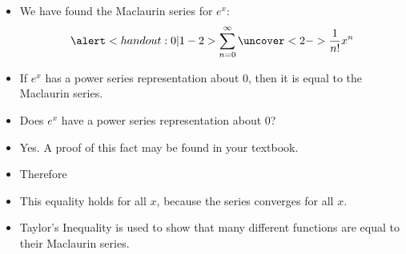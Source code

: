 \begin{frame}
\begin{itemize}
\item  We have found the Maclaurin series for $e^x$:
\abovedisplayskip=0pt
\belowdisplayskip=0pt
\[
\alert<handout:0| 1-2>{\sum_{n=0}^\infty \uncover<2->{\frac{1}{n!}}x^n}
\]
\item<3->  If $e^x$ has a power series representation about $0$, then it is equal to the Maclaurin series.
\item<3->  Does $e^x$ have a power series representation about $0$?
\item<4->  Yes.  A proof of this fact may be found in your textbook.
\item<5->  Therefore
%
\item<6->  This equality holds for all $x$, because the series converges for all $x$.
\item<7->  Taylor's Inequality is used to show that many different functions are equal to their Maclaurin series.
\end{itemize}
\end{frame}
